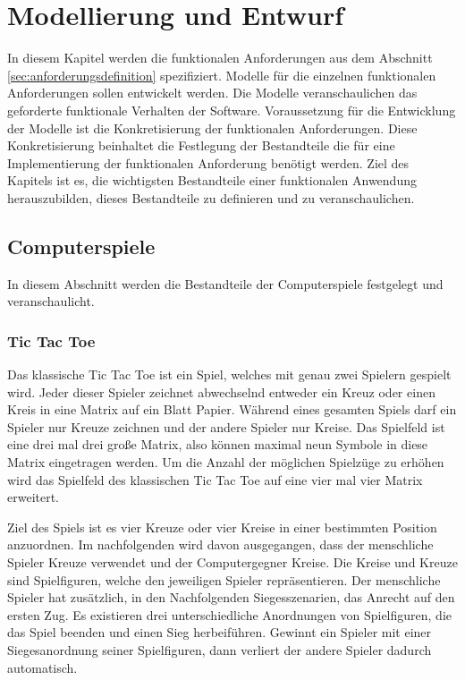 \chapter{Modellierung und Entwurf}
\label{cha:mue}

In diesem Kapitel werden die funktionalen Anforderungen aus dem Abschnitt \ref{sec:anforderungsdefinition} spezifiziert. Modelle für die einzelnen funktionalen Anforderungen sollen entwickelt werden. Die Modelle veranschaulichen das geforderte funktionale Verhalten der Software. Voraussetzung für die Entwicklung der Modelle ist die Konkretisierung der funktionalen Anforderungen. Diese Konkretisierung beinhaltet die Festlegung der Bestandteile die für eine Implementierung der funktionalen Anforderung benötigt werden. Ziel des Kapitels ist es, die wichtigsten Bestandteile einer funktionalen Anwendung herauszubilden, dieses Bestandteile zu definieren und zu veranschaulichen.

\section{Computerspiele}
\label{sec:computerspiele}

In diesem Abschnitt werden die Bestandteile der Computerspiele festgelegt und veranschaulicht. 

\subsection{Tic Tac Toe}
\label{sec:ttt}

Das klassische Tic Tac Toe ist ein Spiel, welches mit genau zwei Spielern gespielt wird. Jeder dieser Spieler zeichnet abwechselnd entweder ein Kreuz oder einen Kreis in eine Matrix auf ein Blatt Papier. Während eines gesamten Spiels darf ein Spieler nur Kreuze zeichnen und der andere Spieler nur Kreise. Das Spielfeld ist eine drei mal drei große Matrix, also können maximal neun Symbole in diese Matrix eingetragen werden. Um die Anzahl der möglichen Spielzüge zu erhöhen wird das Spielfeld des klassischen Tic Tac Toe auf eine vier mal vier Matrix erweitert.


Ziel des Spiels ist es vier Kreuze oder vier Kreise in einer bestimmten Position anzuordnen. Im nachfolgenden wird davon ausgegangen, dass der menschliche Spieler Kreuze verwendet und der Computergegner Kreise. Die Kreise und Kreuze sind Spielfiguren, welche den jeweiligen Spieler repräsentieren. Der menschliche Spieler hat zusätzlich, in den Nachfolgenden Siegesszenarien, das Anrecht auf den ersten Zug. Es existieren drei unterschiedliche Anordnungen von Spielfiguren, die das Spiel beenden und einen Sieg herbeiführen. Gewinnt ein Spieler mit einer Siegesanordnung seiner Spielfiguren, dann verliert der andere Spieler dadurch automatisch.

